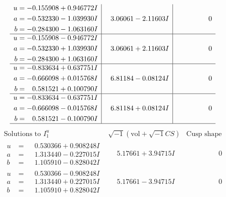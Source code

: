 \documentclass[1p]{elsarticle_modified}
\theoremstyle{definition}
\newcommand{\I}{\sqrt{-1}}
\begin{document}
$$\begin{array}{c|c|c}
\begin{aligned}
u &= -0.155908 + 0.946772 I \\
a &= -0.532330 - 1.039930 I \\
b &= -0.284300 - 1.063160 I\end{aligned}
 & \phantom{-}3.06061 - 2.11603 I & \phantom{-0.000000 } 0 \\ \hline\begin{aligned}
u &= -0.155908 - 0.946772 I \\
a &= -0.532330 + 1.039930 I \\
b &= -0.284300 + 1.063160 I\end{aligned}
 & \phantom{-}3.06061 + 2.11603 I & \phantom{-0.000000 } 0 \\ \hline\begin{aligned}
u &= -0.833634 + 0.637751 I \\
a &= -0.666098 + 0.015768 I \\
b &= \phantom{-}0.581521 + 0.100790 I\end{aligned}
 & \phantom{-}6.81184 - 0.08124 I & \phantom{-0.000000 } 0 \\ \hline\begin{aligned}
u &= -0.833634 - 0.637751 I \\
a &= -0.666098 - 0.015768 I \\
b &= \phantom{-}0.581521 - 0.100790 I\end{aligned}
 & \phantom{-}6.81184 + 0.08124 I & \phantom{-0.000000 } 0\\
 \hline 
 \end{array}$$\newpage$$\begin{array}{c|c|c}  
\text{Solutions to }I^u_{1}& \I (\text{vol} + \sqrt{-1}CS) & \text{Cusp shape}\\
 \hline 
\begin{aligned}
u &= \phantom{-}0.530366 + 0.908248 I \\
a &= \phantom{-}1.313440 - 0.227015 I \\
b &= \phantom{-}1.105910 - 0.828042 I\end{aligned}
 & \phantom{-}5.17661 + 3.94715 I & \phantom{-0.000000 } 0 \\ \hline\begin{aligned}
u &= \phantom{-}0.530366 - 0.908248 I \\
a &= \phantom{-}1.313440 + 0.227015 I \\
b &= \phantom{-}1.105910 + 0.828042 I\end{aligned}
 & \phantom{-}5.17661 - 3.94715 I & \phantom{-0.000000 } 0 \\ \hline\begin{aligned}

\end{aligned}
\end{array}$$
\end{document}
